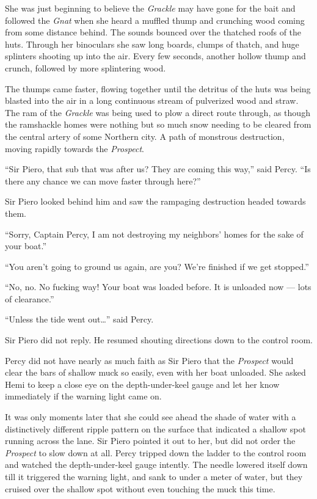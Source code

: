 \documentclass[
]{scrbook}
\begin{document}
She was just beginning to believe the \emph{Grackle} may have gone for
the bait and followed the \emph{Gnat} when she heard a muffled thump and
crunching wood coming from some distance behind. The sounds bounced over
the thatched roofs of the huts. Through her binoculars she saw long
boards, clumps of thatch, and huge splinters shooting up into the air.
Every few seconds, another hollow thump and crunch, followed by more
splintering wood.

The thumps came faster, flowing together until the detritus of the huts
was being blasted into the air in a long continuous stream of pulverized
wood and straw. The ram of the \emph{Grackle} was being used to plow a
direct route through, as though the ramshackle homes were nothing but so
much snow needing to be cleared from the central artery of some Northern
city. A path of monstrous destruction, moving rapidly towards the
\emph{Prospect}.

``Sir Piero, that sub that was after us? They are coming this way,''
said Percy. ``Is there any chance we can move faster through here?''

Sir Piero looked behind him and saw the rampaging destruction headed
towards them.

``Sorry, Captain Percy, I am not destroying my neighbors' homes for the
sake of your boat.''

``You aren't going to ground us again, are you? We're finished if we get
stopped.''

``No, no. No fucking way! Your boat was loaded before. It is unloaded
now --- lots of clearance.''

``Unless the tide went out\ldots{}'' said Percy.

Sir Piero did not reply. He resumed shouting directions down to the
control room.

Percy did not have nearly as much faith as Sir Piero that the
\emph{Prospect} would clear the bars of shallow muck so easily, even
with her boat unloaded. She asked Hemi to keep a close eye on the
depth-under-keel gauge and let her know immediately if the warning light
came on.

It was only moments later that she could see ahead the shade of water
with a distinctively different ripple pattern on the surface that
indicated a shallow spot running across the lane. Sir Piero pointed it
out to her, but did not order the \emph{Prospect} to slow down at all.
Percy tripped down the ladder to the control room and watched the
depth-under-keel gauge intently. The needle lowered itself down till it
triggered the warning light, and sank to under a meter of water, but
they cruised over the shallow spot without even touching the muck this
time.
\end{document}
